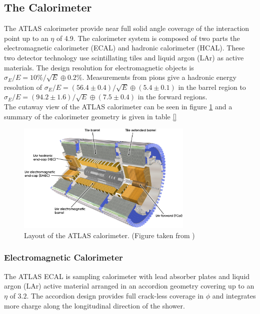 \subsection{The Calorimeter}
\label{LHC:Calorimeter}

\indent The ATLAS calorimeter provide near full solid angle coverage of the interaction point up to an $\eta$ of 4.9.  The calorimeter system is composed of two parts the electromagnetic calorimeter (ECAL) and hadronic calorimeter (HCAL).  These two detector technology use scintillating tiles and liquid argon (LAr) as active materials.  The design resolution for electromagnetic objects is $\sigma_E/E = 10\%/\sqrt{E} \oplus 0.2\%$.  Measurements from pions give a hadronic energy resolution of $\sigma_E/E = (56.4\pm0.4)/\sqrt{E}\oplus(5.4\pm0.1)$ in the barrel region to $\sigma_E/E = (94.2\pm1.6)/\sqrt{E}\oplus(7.5\pm0.4)$ in the forward regions. \\

\indent The cutaway view of the ATLAS calorimeter can be seen in figure \ref{LHC:fig:ATLASCalo} and a summary of the calorimeter geometry is given in table \ref{} \\

\begin{figure}[h!]
\centering
\includegraphics[width=0.75\textwidth, angle=0]{figures/LHC_ATLAS/Calorimeter_d3.eps}
\caption{ Layout of the ATLAS calorimeter. (Figure taken from \cite{ATLAS_JINST}) \label{LHC:fig:ATLASCalo}}
\end{figure}

\subsubsection*{Electromagnetic Calorimeter}

\indent The ATLAS ECAL is sampling calorimeter with lead absorber plates and liquid argon (LAr) active material arranged in an accordion geometry covering up to an $\eta$ of $3.2$.  The accordion design provides full crack-less coverage in $\phi$ and integrates more charge along the longitudinal direction of the shower.  \\


